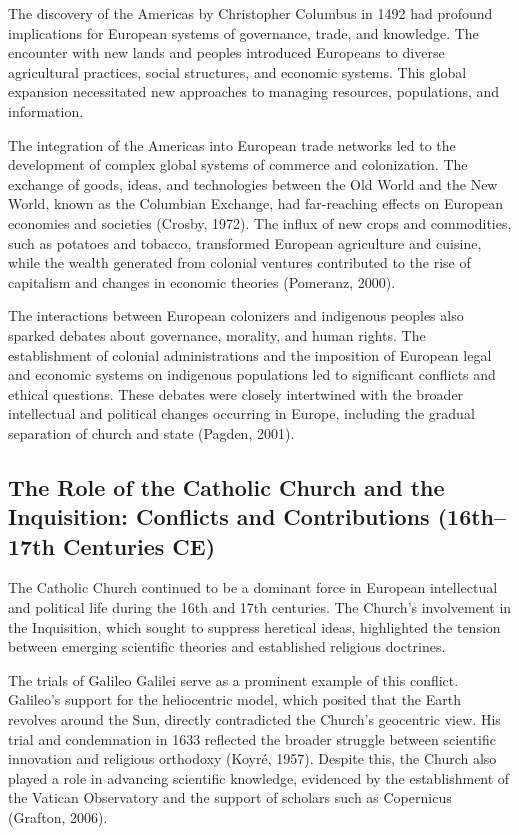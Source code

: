 \documentclass[twocolumn]{article}
\begin{document}
\textcolor{primary}{The discovery of the Americas by Christopher Columbus in 1492 had profound implications for European systems of governance, trade, and knowledge. The encounter with new lands and peoples introduced Europeans to diverse agricultural practices, social structures, and economic systems. This global expansion necessitated new approaches to managing resources, populations, and information.}

\textcolor{secondary}{The integration of the Americas into European trade networks led to the development of complex global systems of commerce and colonization. The exchange of goods, ideas, and technologies between the Old World and the New World, known as the Columbian Exchange, had far-reaching effects on European economies and societies (Crosby, 1972). The influx of new crops and commodities, such as potatoes and tobacco, transformed European agriculture and cuisine, while the wealth generated from colonial ventures contributed to the rise of capitalism and changes in economic theories (Pomeranz, 2000).}

\textcolor{primary}{The interactions between European colonizers and indigenous peoples also sparked debates about governance, morality, and human rights. The establishment of colonial administrations and the imposition of European legal and economic systems on indigenous populations led to significant conflicts and ethical questions. These debates were closely intertwined with the broader intellectual and political changes occurring in Europe, including the gradual separation of church and state (Pagden, 2001).}

\subsection{The Role of the Catholic Church and the Inquisition: Conflicts and Contributions (16th–17th Centuries CE)}

\textcolor{primary}{The Catholic Church continued to be a dominant force in European intellectual and political life during the 16th and 17th centuries. The Church’s involvement in the Inquisition, which sought to suppress heretical ideas, highlighted the tension between emerging scientific theories and established religious doctrines.}

\textcolor{secondary}{The trials of Galileo Galilei serve as a prominent example of this conflict. Galileo’s support for the heliocentric model, which posited that the Earth revolves around the Sun, directly contradicted the Church’s geocentric view. His trial and condemnation in 1633 reflected the broader struggle between scientific innovation and religious orthodoxy (Koyré, 1957). Despite this, the Church also played a role in advancing scientific knowledge, evidenced by the establishment of the Vatican Observatory and the support of scholars such as Copernicus (Grafton, 2006).}
\end{document}
